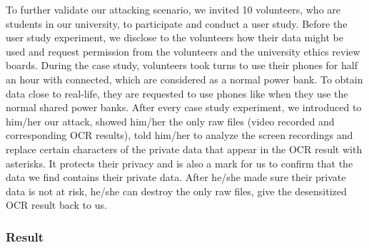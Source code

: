
To further validate our attacking scenario, we invited 10 volunteers, who are students in our university, to participate and conduct a user study.
Before the user study experiment, we disclose to the volunteers how their data might be used and request permission from the volunteers and the university ethics review boards.
During the case study, volunteers took turns to use their phones for half an hour with \tool connected, which are considered as a normal power bank.
To obtain data close to real-life, they are requested to use phones like when they use the normal shared power banks.
After every case study experiment, we introduced to him/her our attack, showed him/her the only raw files (video recorded and corresponding \ac{OCR} results), told him/her to analyze the screen recordings and replace certain characters of the private data that appear in the \ac{OCR} result with asterisks. It protects their privacy and is also a mark for us to confirm that the data we find contains their private data. After he/she made sure their private data is not at risk, he/she can destroy the only raw files, give the desensitized \ac{OCR} result back to us. 


\subsubsection{Result}

